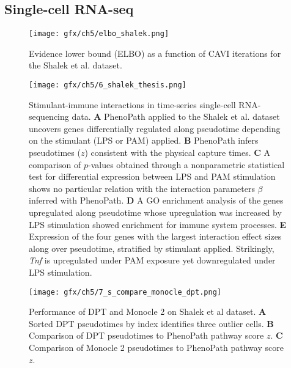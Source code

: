 \subsection{Single-cell RNA-seq} \label{sec:shalek}

\begin{figure}
\centering
\texttt{[image: gfx/ch5/elbo\_shalek.png]}
\caption{Evidence lower bound (ELBO) as a function of CAVI iterations for the Shalek et al. dataset.}\label{fig:elbo_shalek}
\end{figure}

\begin{figure}
\centering
  \texttt{[image: gfx/ch5/6\_shalek\_thesis.png]}
  \caption{Stimulant-immune interactions in time-series single-cell RNA-sequencing data.
  \textbf{A} PhenoPath applied to the Shalek et al. dataset uncovers genes differentially regulated along pseudotime depending on the stimulant (LPS or PAM) applied.
  \textbf{B} PhenoPath infers pseudotimes ($z$) consistent with the physical capture times.
  \textbf{C} A comparison of $p$-values obtained through a nonparametric statistical test for differential expression between LPS and PAM stimulation shows no particular relation with the interaction parameters $\beta$ inferred with PhenoPath.
  \textbf{D} A GO enrichment analysis of the genes upregulated along pseudotime whose upregulation was increased by LPS stimulation showed enrichment for immune system processes.
  \textbf{E} Expression of the four genes with the largest interaction effect sizes along over pseudotime, stratified by stimulant applied. Strikingly, \emph{Tnf} is upregulated under PAM exposure yet downregulated under LPS stimulation.}  \label{fig:shalek}
\end{figure}

\begin{figure}
   \texttt{[image: gfx/ch5/7\_s\_compare\_monocle\_dpt.png]}
   \caption{Performance of DPT and Monocle 2 on Shalek et al dataset.
\textbf{A} Sorted DPT pseudotimes by index identifies three outlier cells. \textbf{B} Comparison of DPT pseudotimes to PhenoPath pathway score $z$. \textbf{C} Comparison of Monocle 2 pseudotimes to PhenoPath pathway score $z$.}
	\label{fig:shalek_comparison}
\end{figure}

